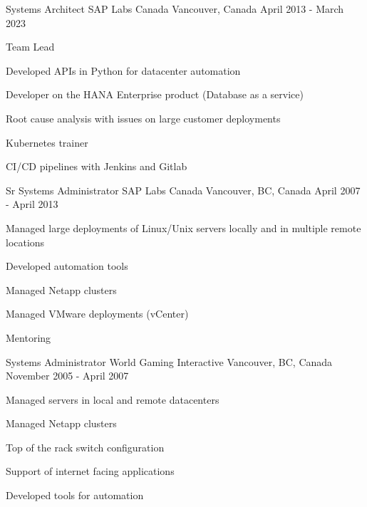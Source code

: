 

\begin{cventries}

  \cventry
    {Systems Architect} %
    {SAP Labs Canada} %
    {Vancouver, Canada} %
    {April 2013 - March 2023} %
    {
      \begin{cvitems} %
        \item {Team Lead}
        \item {Developed APIs in Python for datacenter automation}
        \item {Developer on the HANA Enterprise product (Database as a service)}
        \item {Root cause analysis with issues on large customer deployments}
        \item {Kubernetes trainer}
        \item {CI/CD pipelines with Jenkins and Gitlab}
      \end{cvitems}
    }

  \cventry
    {Sr Systems Administrator} %
    {SAP Labs Canada} %
    {Vancouver, BC, Canada} %
    {April 2007 - April 2013} %
    {
      \begin{cvitems} %
        \item {Managed large deployments of Linux/Unix servers locally and in multiple remote locations}
        \item {Developed automation tools}
        \item {Managed Netapp clusters}
        \item {Managed VMware deployments (vCenter)}
        \item {Mentoring}
      \end{cvitems}
    }

  \cventry
    {Systems Administrator} %
    {World Gaming Interactive} %
    {Vancouver, BC, Canada} %
    {November 2005 - April 2007} %
    {
      \begin{cvitems} %
        \item {Managed servers in local and remote datacenters}
        \item {Managed Netapp clusters}
        \item {Top of the rack switch configuration}
        \item {Support of internet facing applications}
        \item {Developed tools for automation}
      \end{cvitems}
    }


\end{cventries}

